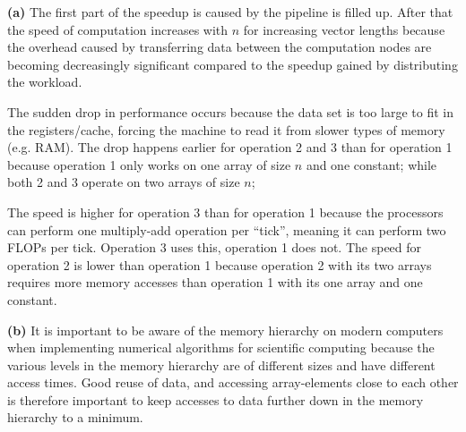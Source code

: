 \textbf{(a)} The first part of the speedup is caused by the pipeline is filled up. After that the speed of computation increases with $n$ for increasing vector lengths because the overhead caused by transferring data between the computation nodes are becoming decreasingly significant compared to the speedup gained by distributing the workload.

The sudden drop in performance occurs because the data set is too large to fit in the registers/cache, forcing the machine to read it from slower types of memory (e.g. RAM). The drop happens earlier for operation 2 and 3 than for operation 1 because operation 1 only works on one array of size $n$ and one constant; while both 2 and 3 operate on two arrays of size $n$;

The speed is higher for operation 3 than for operation 1 because the processors can perform one multiply-add operation per ``tick'', meaning it can perform two FLOPs per tick. Operation 3 uses this, operation 1 does not. The speed for operation 2 is lower than operation 1 because operation 2 with its two arrays requires more memory accesses than operation 1 with its one array and one constant.

\noindent\textbf{(b)} It is important to be aware of the memory hierarchy on modern computers when implementing numerical algorithms for scientific computing because the various levels in the memory hierarchy are of different sizes and have different access times. Good reuse of data, and accessing array-elements close to each other is therefore important to keep accesses to data further down in the memory hierarchy to a minimum.
\pagebreak

